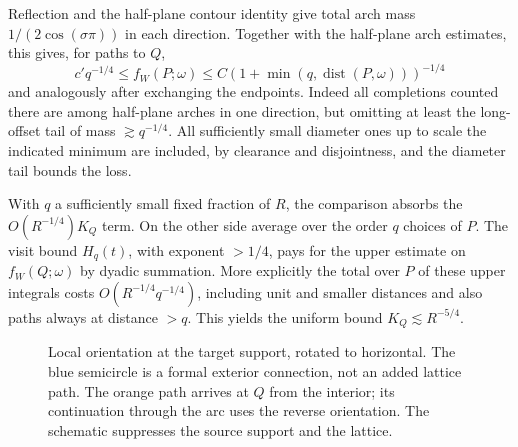Reflection and the half-plane contour identity give total arch mass
\(1/(2\cos(\sigma\pi))\) in each direction. Together with the
half-plane arch estimates, this gives, for paths to \(Q\),
\begin{equation}\label{c:tilted-completion-bounds}
 c' q^{-1/4}\le f_W(P;\omega)\le C(1+\min(q,\operatorname{dist}(P,\omega)))^{-1/4}
\end{equation}
and analogously after exchanging the endpoints. Indeed all completions counted there are among half-plane arches in one direction, but omitting at least the long-offset tail of mass \(\gtrsim q^{-1/4}\). All sufficiently small diameter ones up to scale the indicated minimum are included, by clearance and disjointness, and the diameter tail bounds the loss.



With \(q\) a sufficiently small fixed fraction of \(R\), the comparison absorbs the \(O(R^{-1/4})K_Q\) term. On the other side average over the order \(q\) choices of \(P\). The visit bound \(H_q(t)\), with exponent \(>1/4\), pays for the upper estimate on \(f_W(Q;\omega)\) by dyadic summation. More explicitly the total over \(P\) of these upper integrals costs \(O(R^{-1/4}q^{-1/4})\), including unit and smaller distances and also paths always at distance \(>q\). This yields the uniform bound \(K_Q\lesssim R^{-5/4}\).




\begin{figure}[htbp]
\centering
{}
\caption{Local orientation at the target support, rotated to horizontal.
The blue semicircle is a formal exterior connection, not an added lattice
path. The orange path arrives at $Q$ from the interior; its continuation
through the arc uses the reverse orientation. The schematic suppresses
the source support and the lattice.}\label{c:fig:arc}
\end{figure}

